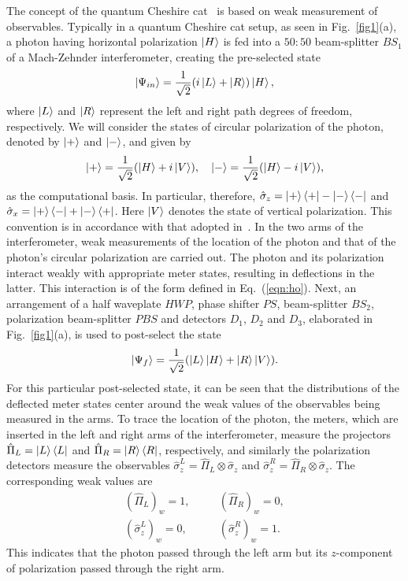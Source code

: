 \documentclass[aps,pra,showpacs,twoside,twocolumn,10pt]{revtex4-1}
\begin{document}
The concept of the quantum Cheshire cat~\cite{Aharonov} is based on weak measurement of observables. Typically in a quantum Cheshire cat setup, as seen in Fig.~\ref{fig1}(a), a photon having horizontal polarization $\ket{H}$ is fed into a $50:50$ beam-splitter $BS_1$ of a  Mach-Zehnder interferometer, creating the pre-selected state
\begin{equation}
    \ket{\Psi_{in}}=\frac{1}{\sqrt{2}}(i\ket{L}+\ket{R})\ket{H},
    \label{eq:psi_in}
\end{equation}
where $\ket{L}$ and $\ket{R}$ represent the left and right path degrees of freedom, respectively. We will consider the states of circular polarization of the photon, denoted by $\ket{+}$ and $\ket{-}$, and given by
\begin{equation}
\label{eq:6}
\ket{+}=\frac{1}{\sqrt{2}}(\ket{H}+i\ket{V}),\quad\ket{-}=\frac{1}{\sqrt{2}}(\ket{H}-i\ket{V}),
\end{equation}
as the computational basis. In particular, therefore, $\hat{\sigma}_z=\ket{+}\bra{+}-\ket{-}\bra{-}$ and $\hat{\sigma}_x=\ket{+}\bra{-}+\ket{-}\bra{+}$. Here $\ket{V}$ denotes the state of vertical polarization. This convention is in accordance with that adopted in~\cite{Aharonov}.
In the two arms of the interferometer, weak measurements of the location of the photon and that 
of the photon's circular polarization are carried out. The photon and its polarization interact weakly with appropriate meter states, resulting in deflections in the latter. This interaction is of the form defined in Eq.~(\ref{eqn:ho}).  Next, an arrangement of a half waveplate $HWP$, phase shifter $PS$, beam-splitter $BS_2$, polarization beam-splitter $PBS$ and detectors $D_1$, $D_2$ and $D_3$, elaborated in Fig.~\ref{fig1}(a), is used to post-select the state 
\begin{equation}
    \ket{\Psi_f}=\frac{1}{\sqrt{2}}(\ket{L}\ket{H}+\ket{R}\ket{V}).
    \label{eq:psi_f}
\end{equation}
For this particular post-selected state, it can be seen that the distributions of the deflected meter states center around the weak values of the observables being measured in the arms. To trace the location of the photon, the meters, which are inserted in the left and right arms of the interferometer, measure the projectors $\hat{\Pi}_L=\ket{L}\bra{L}$ and $\hat{\Pi}_R=\ket{R}\bra{R}$, respectively, and similarly the polarization detectors measure the observables $\hat{\sigma}_z^{L}=\hat{\Pi}_L \otimes \hat{\sigma}_z$ and $\hat{\sigma}_z^{R}=\hat{\Pi}_R \otimes \hat{\sigma}_z$.
The corresponding weak values are
\begin{eqnarray}
     (\hat{\Pi}_L)_w=1, && \quad (\hat{\Pi}_R)_w=0, \nonumber\\
     (\hat{\sigma}_z^{L})_w=0, && \quad (\hat{\sigma}_z^{R})_w=1.
\end{eqnarray}
This indicates that the photon passed through the left arm but its $z$-component of polarization passed through the right arm.
\end{document}
